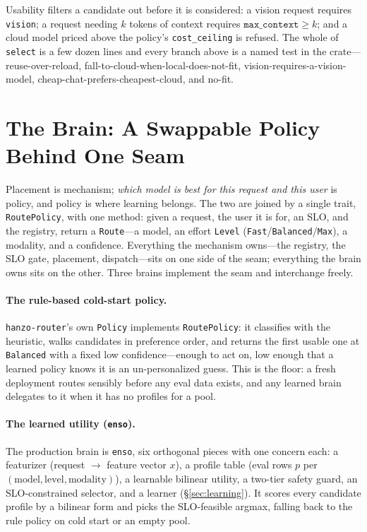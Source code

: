 \documentclass[11pt]{article}
\begin{document}
Usability filters a candidate out before it is considered: a vision request
requires \texttt{vision}; a request needing $k$ tokens of context requires
$\texttt{max\_context}\ge k$; and a cloud model priced above the policy's
\texttt{cost\_ceiling} is refused. The whole of \texttt{select} is a few dozen
lines and every branch above is a named test in the crate---reuse-over-reload,
fall-to-cloud-when-local-does-not-fit, vision-requires-a-vision-model,
cheap-chat-prefers-cheapest-cloud, and no-fit.

\section{The Brain: A Swappable Policy Behind One Seam}
\label{sec:brain}

Placement is mechanism; \emph{which model is best for this request and this
user} is policy, and policy is where learning belongs. The two are joined by a
single trait, \texttt{RoutePolicy}, with one method: given a request, the user
it is for, an SLO, and the registry, return a \texttt{Route}---a model, an effort
\texttt{Level} (\texttt{Fast}/\texttt{Balanced}/\texttt{Max}), a modality, and a
confidence. Everything the mechanism owns---the registry, the SLO gate,
placement, dispatch---sits on one side of the seam; everything the brain owns
sits on the other. Three brains implement the seam and interchange freely.

\paragraph{The rule-based cold-start policy.} \texttt{hanzo-router}'s own
\texttt{Policy} implements \texttt{RoutePolicy}: it classifies with the
heuristic, walks candidates in preference order, and returns the first usable
one at \texttt{Balanced} with a fixed low confidence---enough to act on, low
enough that a learned policy knows it is an un-personalized guess. This is the
floor: a fresh deployment routes sensibly before any eval data exists, and any
learned brain delegates to it when it has no profiles for a pool.

\paragraph{The learned utility (\texttt{enso}).} The production brain is
\texttt{enso}, six orthogonal pieces with one concern each: a featurizer
(request $\to$ feature vector $x$), a profile table (eval rows $p$ per
$(\text{model},\text{level},\text{modality})$), a learnable bilinear utility, a
two-tier safety guard, an SLO-constrained selector, and a learner
(\S\ref{sec:learning}). It scores every candidate profile by a bilinear form and
picks the SLO-feasible argmax, falling back to the rule policy on cold start or
an empty pool.
\end{document}
